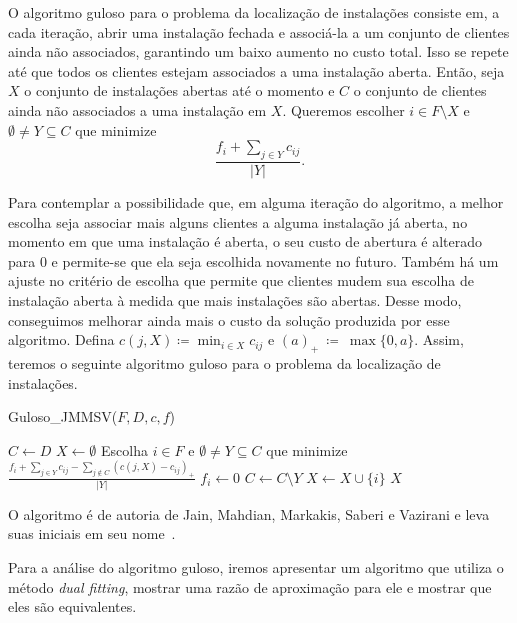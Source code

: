 O algoritmo guloso para o problema da localização de instalações consiste em, a cada iteração, abrir uma instalação fechada e associá-la a um conjunto de clientes ainda não associados, garantindo um baixo aumento no custo total. 
Isso se repete até que todos os clientes estejam associados a uma instalação aberta. Então, seja $X$ o conjunto de instalações abertas até o momento e $C$ o conjunto de clientes ainda não associados a uma instalação em $X$. Queremos escolher $i \in F \setminus X$ e $\emptyset \neq Y \subseteq C$ que minimize
\[ \frac{f_i + \sum_{j \in Y} c_{ij}}{|Y|}.
    \] 

Para contemplar a possibilidade que, em alguma iteração do algoritmo, a melhor escolha seja associar mais alguns clientes a alguma instalação já aberta, no momento em que uma instalação é aberta, o seu custo de abertura é alterado para 0 e permite-se que ela seja escolhida novamente no futuro. Também há um ajuste no critério de escolha que permite que clientes mudem sua escolha de instalação aberta à medida que mais instalações são abertas. Desse modo, conseguimos melhorar ainda mais o custo da solução produzida por esse algoritmo. Defina $c(j,X) \coloneqq \min_{i \in X} c_{ij}$ e $(a)_+~\coloneqq~\max\{0,a\}$. Assim, teremos o seguinte algoritmo guloso para o problema da localização de instalações.
\begin{algorithm}
    \caption{Guloso\_JMMSV($F,D,c,f$)}
    \begin{algorithmic}[1]
        \State $C \gets D$
        \State $X \gets \emptyset$
        \State Escolha $i \in F$ e $\emptyset \neq Y \subseteq C$ que minimize $\frac{f_i + \sum_{j \in Y}c_{ij} - \sum_{j \not \in C}(c(j,X) - c_{ij})_+ }{|Y|}$
        \State $f_i \gets 0$
        \State $C \gets C \setminus Y$
        \State $X \gets X \cup \{i\}$
        \EndWhile
        \State \Return $X$
    \end{algorithmic}
\end{algorithm}

O algoritmo é de autoria de Jain, Mahdian, Markakis, Saberi e Vazirani e leva suas iniciais em seu nome~\cite{jain2002greedy}.

Para a análise do algoritmo guloso, iremos apresentar um algoritmo que utiliza o método \emph{dual fitting}, mostrar uma razão de aproximação para ele e mostrar que eles são equivalentes.

